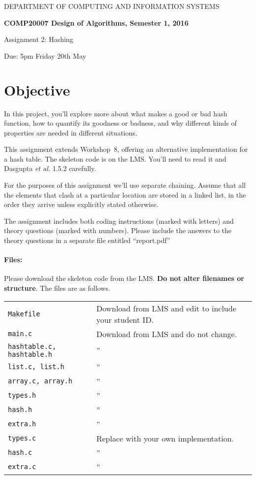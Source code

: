 \documentclass[11pt]{article}
\title{}
\date{}
\begin{document}
{\large
\begin{center}
DEPARTMENT OF COMPUTING AND INFORMATION SYSTEMS\vspace{2ex}

{\Large\bf
COMP20007 Design of Algorithms, Semester 1, 2016

Assignment 2: Hashing
}\vspace{2ex}

Due: 5pm Friday 20th May
\end{center}
}

\section*{Objective}
In this project, you'll explore more about what makes a good or bad hash function,
how to quantify its goodness or badness,
and why different kinds of properties are needed in different situations.

This assignment extends Workshop~8,
offering an alternative implementation for a hash table.
The skeleton code is on the LMS\@.
You'll need to read it and Dasgupta {\it et al.} \/1.5.2 carefully.

For the purposes of this assignment we'll use separate chaining.
Assume that all the elements that clash at a particular location are stored in a linked list,
in the order they arrive unless explicitly stated otherwise.

The assignment includes both coding instructions
(marked with letters)
and theory questions (marked with numbers).
Please include the answers to the theory questions in a separate file entitled ``report.pdf''

\paragraph{Files:}
Please download the skeleton code from the LMS\@.
{\bf Do not alter filenames or structure}.
The files are as follows.

\begin{center}
\begin{tabular}{ll}
\toprule
\texttt{Makefile} & Download from LMS and edit to include your student ID.\\
\texttt{main.c} & Download from LMS and do not change.\\
\texttt{hashtable.c, hashtable.h} & '' \\
\texttt{list.c, list.h} & '' \\
\texttt{array.c, array.h} & '' \\
\texttt{types.h} & '' \\
\texttt{hash.h} & '' \\
\texttt{extra.h} & '' \\
\midrule
\texttt{types.c} & Replace with your own implementation.\\
\texttt{hash.c} & '' \\
\texttt{extra.c} & '' \\
\bottomrule
\end{tabular}
\end{center}
\end{document}
